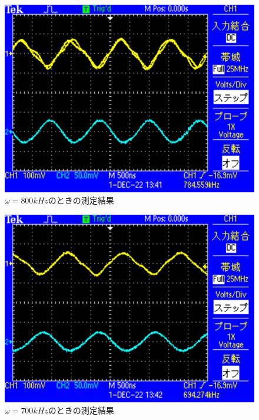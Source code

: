 \begin{figure}[H]
    \centering
    \includegraphics[scale=0.5]{TEK0003.pdf}
    \caption{$\omega=800\si{kHz}$のときの測定結果}
\end{figure}

\begin{figure}[H]
    \centering
    \includegraphics[scale=0.5]{TEK0004.pdf}
    \caption{$\omega=700\si{kHz}$のときの測定結果}
\end{figure}

